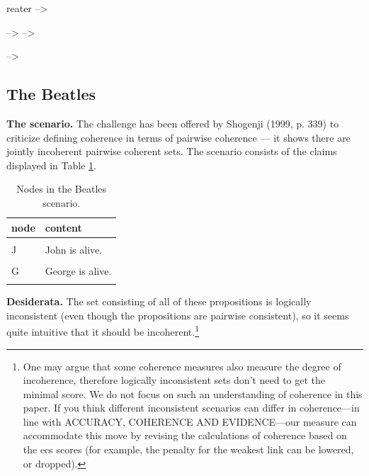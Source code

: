 \documentclass[
  10pt,
]{scrartcl}
\newcommand{\s}[1]{\textsf{#1}}
\begin{document}
reater{}
--\textgreater{}

--\textgreater{}
--\textgreater{}

--\textgreater{}

\hypertarget{the-beatles}{%
\subsection{The Beatles}\label{the-beatles}}


\textbf{The scenario.} The challenge has been offered by Shogenji (1999, p. 339) to criticize defining coherence in terms of pairwise coherence --- it shows there are jointly incoherent pairwise coherent sets. The scenario consists of the claims displayed in Table \ref{tab:beatles}.

\begin{table}[H]

\caption{\label{tab:beatles}Nodes in the Beatles scenario.}
\centering
\begin{tabular}[t]{ll}
\toprule
node & content\\
\midrule
\cellcolor{gray!6}{D} & \cellcolor{gray!6}{Exactly one of the Beatles (John, Paul, George and Ringo) is dead.}\\
J & John is alive.\\
\cellcolor{gray!6}{P} & \cellcolor{gray!6}{Paul is alive.}\\
G & George is alive.\\
\cellcolor{gray!6}{R} & \cellcolor{gray!6}{Ringo is alive.}\\
\bottomrule
\end{tabular}
\end{table}


\noindent  \textbf{Desiderata.} The set consisting of all of these propositions is logically inconsistent (even though the propositions are pairwise consistent), so it seems quite intuitive that it should be incoherent.\footnote{One may argue that some coherence measures also measure the degree of incoherence, therefore logically inconsistent sets don't need to get the minimal score. We do not focus on such an understanding of coherence in this paper. If you think different inconsistent scenarios can differ in coherence---in line with ACCURACY, COHERENCE AND EVIDENCE---our measure can accommodate this move by revising the calculations of coherence based on the \s{ecs} scores (for example, the penalty for the weakest link can be lowered, or dropped).}
\vspace{2mm}
\end{document}
